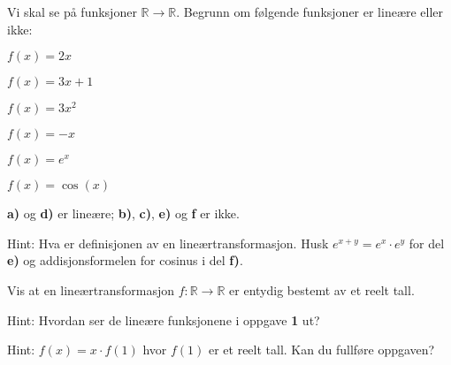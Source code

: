 
\begin{oppgave}
Vi skal se på funksjoner $\mathbb{R}\rightarrow \mathbb{R}$. Begrunn om følgende funksjoner er lineære eller ikke:

\begin{punkt}
$f(x) = 2x$
\end{punkt}

\begin{punkt}
$f(x) = 3x+1$
\end{punkt}

\begin{punkt}
$f(x) = 3x^2$
\end{punkt}

\begin{punkt}
$f(x)= -x$
\end{punkt}

\begin{punkt}
$f(x)=e^x$
\end{punkt}

\begin{punkt}
$f(x)=\cos (x)$
\end{punkt}
\end{oppgave}

\begin{losning}

\textbf{a)} og \textbf{d)} er lineære; \textbf{b)}, \textbf{c)}, \textbf{e)} og \textbf{f} er ikke.

\noindent
Hint: Hva er definisjonen av en lineærtransformasjon. Husk $e^{x+y}=e^x\cdot e^y$ for del \textbf{e)} og addisjonsformelen for cosinus i del \textbf{f)}.

\end{losning}


\begin{oppgave}
Vis at en lineærtransformasjon $f:\mathbb{R}\rightarrow \mathbb{R}$ er entydig bestemt av et reelt tall.

\noindent 
Hint: Hvordan ser de lineære funksjonene i oppgave \textbf{1} ut?
\end{oppgave}


\begin{losning}
Hint: $f(x)=x\cdot f(1)$ hvor $f(1)$ er et reelt tall. Kan du fullføre oppgaven?
\end{losning}
